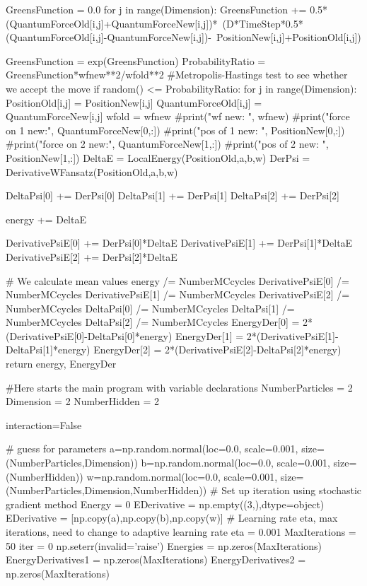 \documentclass[%
oneside,                 %
final,                   %
10pt]{article}
\begin{document}
            GreensFunction = 0.0
            for j in range(Dimension):
                GreensFunction += 0.5*(QuantumForceOld[i,j]+QuantumForceNew[i,j])*\
                                      (D*TimeStep*0.5*(QuantumForceOld[i,j]-QuantumForceNew[i,j])-\
                                      PositionNew[i,j]+PositionOld[i,j])
      
            GreensFunction = exp(GreensFunction)
            ProbabilityRatio = GreensFunction*wfnew**2/wfold**2
            #Metropolis-Hastings test to see whether we accept the move
            if random() <= ProbabilityRatio:
                for j in range(Dimension):
                    PositionOld[i,j] = PositionNew[i,j]
                    QuantumForceOld[i,j] = QuantumForceNew[i,j]
                wfold = wfnew
        #print("wf new:        ", wfnew)
        #print("force on 1 new:", QuantumForceNew[0,:])
        #print("pos of 1 new:  ", PositionNew[0,:])
        #print("force on 2 new:", QuantumForceNew[1,:])
        #print("pos of 2 new:  ", PositionNew[1,:])
        DeltaE = LocalEnergy(PositionOld,a,b,w)
        DerPsi = DerivativeWFansatz(PositionOld,a,b,w)
        
        DeltaPsi[0] += DerPsi[0]
        DeltaPsi[1] += DerPsi[1]
        DeltaPsi[2] += DerPsi[2]
        
        energy += DeltaE

        DerivativePsiE[0] += DerPsi[0]*DeltaE
        DerivativePsiE[1] += DerPsi[1]*DeltaE
        DerivativePsiE[2] += DerPsi[2]*DeltaE
            
    # We calculate mean values
    energy /= NumberMCcycles
    DerivativePsiE[0] /= NumberMCcycles
    DerivativePsiE[1] /= NumberMCcycles
    DerivativePsiE[2] /= NumberMCcycles
    DeltaPsi[0] /= NumberMCcycles
    DeltaPsi[1] /= NumberMCcycles
    DeltaPsi[2] /= NumberMCcycles
    EnergyDer[0]  = 2*(DerivativePsiE[0]-DeltaPsi[0]*energy)
    EnergyDer[1]  = 2*(DerivativePsiE[1]-DeltaPsi[1]*energy)
    EnergyDer[2]  = 2*(DerivativePsiE[2]-DeltaPsi[2]*energy)
    return energy, EnergyDer


#Here starts the main program with variable declarations
NumberParticles = 2
Dimension = 2
NumberHidden = 2

interaction=False

# guess for parameters
a=np.random.normal(loc=0.0, scale=0.001, size=(NumberParticles,Dimension))
b=np.random.normal(loc=0.0, scale=0.001, size=(NumberHidden))
w=np.random.normal(loc=0.0, scale=0.001, size=(NumberParticles,Dimension,NumberHidden))
# Set up iteration using stochastic gradient method
Energy = 0
EDerivative = np.empty((3,),dtype=object)
EDerivative = [np.copy(a),np.copy(b),np.copy(w)]
# Learning rate eta, max iterations, need to change to adaptive learning rate
eta = 0.001
MaxIterations = 50
iter = 0
np.seterr(invalid='raise')
Energies = np.zeros(MaxIterations)
EnergyDerivatives1 = np.zeros(MaxIterations)
EnergyDerivatives2 = np.zeros(MaxIterations)
\end{document}
